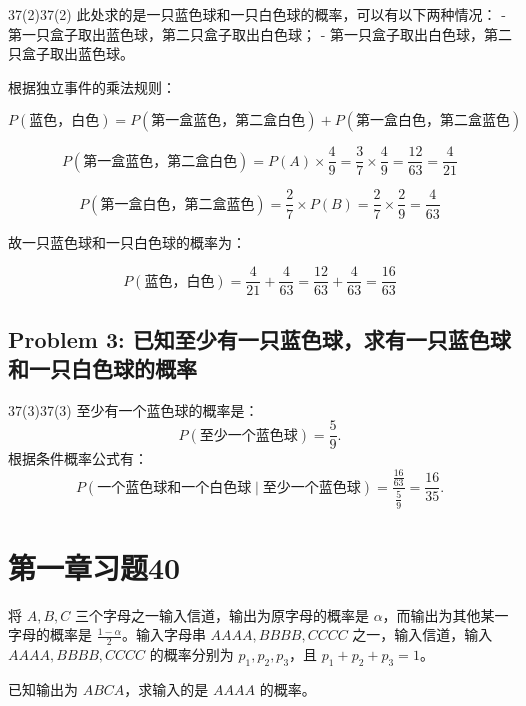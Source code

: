 \documentclass[twoside]{article}
\begin{document}
\begin{ans}{37(2)}{37(2)}
    此处求的是一只蓝色球和一只白色球的概率，可以有以下两种情况：
    - 第一只盒子取出蓝色球，第二只盒子取出白色球；
    - 第一只盒子取出白色球，第二只盒子取出蓝色球。
    
    根据独立事件的乘法规则：
    
    \[
    P(\text{蓝色，白色}) = P(\text{第一盒蓝色，第二盒白色}) + P(\text{第一盒白色，第二盒蓝色})
    \]
    
    \[
    P(\text{第一盒蓝色，第二盒白色}) = P(A) \times \frac{4}{9} = \frac{3}{7} \times \frac{4}{9} = \frac{12}{63} = \frac{4}{21}
    \]
    
    \[
    P(\text{第一盒白色，第二盒蓝色}) = \frac{2}{7} \times P(B) = \frac{2}{7} \times \frac{2}{9} = \frac{4}{63}
    \]
    
    故一只蓝色球和一只白色球的概率为：
    
    \[
    P(\text{蓝色，白色}) = \frac{4}{21} + \frac{4}{63} = \frac{12}{63} + \frac{4}{63} = \frac{16}{63}
    \]
    
\end{ans}
    
\subsection*{Problem 3: 已知至少有一只蓝色球，求有一只蓝色球和一只白色球的概率}
    
\begin{ans}{37(3)}{37(3)}
    至少有一个蓝色球的概率是：
    \[
    P(\text{至少一个蓝色球}) = \frac{5}{9}.
    \]
    根据条件概率公式有：
    \[
    P(\text{一个蓝色球和一个白色球} \mid \text{至少一个蓝色球}) = \frac{\frac{16}{63}}{\frac{5}{9}} = \frac{16}{35}.
    \]
\end{ans}


\section{第一章习题40}

将 $A, B, C$ 三个字母之一输入信道，输出为原字母的概率是 $\alpha$，而输出为其他某一字母的概率是 $\frac{1-\alpha}{2}$。输入字母串 $AAAA, BBBB, CCCC$ 之一，输入信道，输入 $AAAA, BBBB, CCCC$ 的概率分别为 $p_1, p_2, p_3$，且 $p_1 + p_2 + p_3 = 1$。

已知输出为 $ABCA$，求输入的是 $AAAA$ 的概率。
\end{document}
